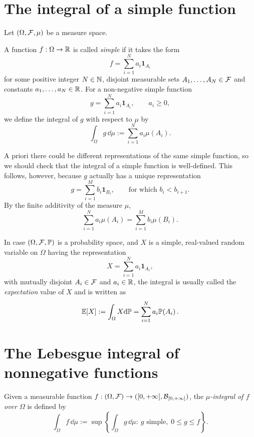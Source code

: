 \section{The integral of a simple function}\label{sec:integral_simple_functions}

Let $(\Omega, \mathcal F, \mu)$ be a measure space. 

\begin{definition}
	A function $f: \Omega \to \mathbb R$ is called \emph{simple} if it takes the form
	\[
	f = \sum_{i=1}^N a_i \mathbf{1}_{A_i}
	\]
	for some positive integer $N \in \mathbb N$, disjoint measurable sets $A_1, \ldots, A_N \in \mathcal F$ and constants $a_1, \dots, a_N  \in \mathbb R$. For a non-negative simple function
\[
g = \sum_{i=1}^N a_i \mathbf{1}_{A_i},\qquad a_i\ge 0,
\]
we define the integral of $g$ with respect to $\mu$ by
\[
\int_\Omega g\, \dd \mu := \sum_{i = 1}^N a_i \mu(A_i).
\]
\end{definition}

A priori there could be different representations of the same simple function, so we should check that the integral of a simple function is well-defined. 
This follows, however, because $g$ actually has a unique representation 
\[
	g = \sum_{i=1}^M b_i \mathbf{1}_{B_i},\qquad \text{for which $b_i < b_{i+1}$}.
\]
By the finite additivity of the measure $\mu$,
\[
\sum_{i=1}^N a_i \mu(A_i) = \sum_{i=1}^M b_i \mu(B_i).
\]

\begin{remark}
	In case $(\Omega, \mathcal F, \mathbb P)$ is a probability space, and $X$ is a simple, real-valued random variable on $\Omega$ having the representation
\[
	X = \sum_{i=1}^N a_i \mathbf{1}_{A_i},
\]
with mutually disjoint $A_i \in \mathcal F$ and $a_i \in \mathbb R$, the integral is usually called the \emph{expectation} value of $X$ and is written as
\[
	\mathbb E\!\left[X\right] := \int_\Omega X \mathrm{d} \mathbb P = \sum_{i=1}^N a_i \mathbb P\!\left(A_i\right).
\]

\end{remark}

\section{The Lebesgue integral of nonnegative functions}

\begin{definition}
	Given a measurable function $f: (\Omega, \mathcal F) \to ([0,+\infty],\mathcal B_{[0,+\infty]})$, the \emph{$\mu$-integral of $f$ over $\Omega$} is defined by
\[
\int_\Omega f\, \dd \mu := \sup\left\{ \int_\Omega g\, \dd \mu : \ g \text{ simple},\; 0 \leq g  \leq f \right\}.
\]
\end{definition}

